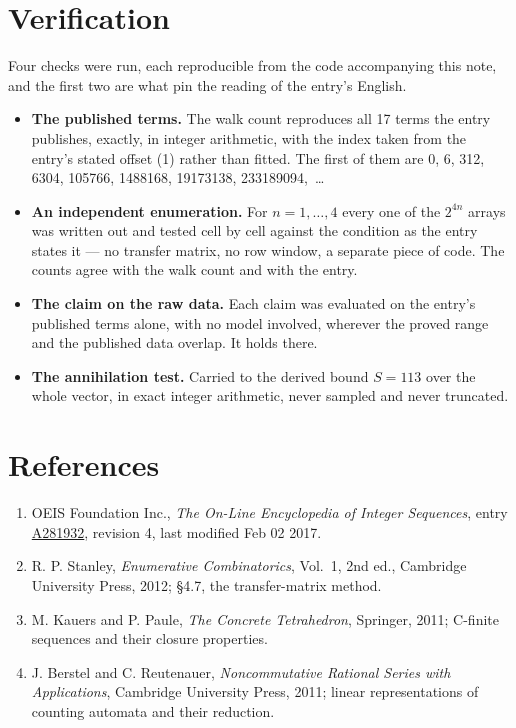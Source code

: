 \documentclass[11pt]{article}
\theoremstyle{definition}
\begin{document}
\section{Verification}

Four checks were run, each reproducible from the code accompanying this note, and the first two are what pin the reading of the entry's English.

\begin{itemize}

\item {\bfseries The published terms.} The walk count reproduces all 17 terms the entry publishes, exactly, in integer arithmetic, with the index taken from the entry's stated offset (1) rather than fitted. The first of them are 0, 6, 312, 6304, 105766, 1488168, 19173138, 233189094,~\dots

\item {\bfseries An independent enumeration.} For $n = 1,\dots,4$ every one of the $2^{4n}$ arrays was written out and tested cell by cell against the condition as the entry states it --- no transfer matrix, no row window, a separate piece of code. The counts agree with the walk count and with the entry.

\item {\bfseries The claim on the raw data.} Each claim was evaluated on the entry's published terms alone, with no model involved, wherever the proved range and the published data overlap. It holds there.

\item {\bfseries The annihilation test.} Carried to the derived bound $S = 113$ over the whole vector, in exact integer arithmetic, never sampled and never truncated.

\end{itemize}

\section{References}

\begin{enumerate}

\item OEIS Foundation Inc., \emph{The On-Line Encyclopedia of Integer Sequences}, entry \href{https://oeis.org/A281932}{A281932}, revision 4, last modified Feb 02 2017.

\item R. P. Stanley, \emph{Enumerative Combinatorics}, Vol.~1, 2nd ed., Cambridge University Press, 2012; \S4.7, the transfer-matrix method.

\item M. Kauers and P. Paule, \emph{The Concrete Tetrahedron}, Springer, 2011; C-finite sequences and their closure properties.

\item J. Berstel and C. Reutenauer, \emph{Noncommutative Rational Series with Applications}, Cambridge University Press, 2011; linear representations of counting automata and their reduction.

\end{enumerate}
\end{document}
